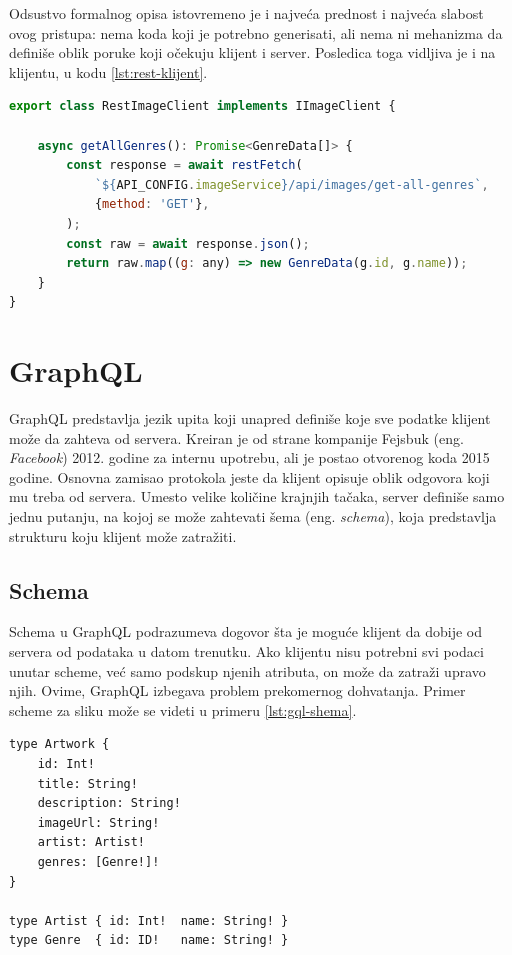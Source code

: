 \documentclass[12pt,oneside]{memoir}
\begin{document}
Odsustvo formalnog opisa istovremeno je i najveća prednost i najveća slabost
ovog pristupa: nema koda koji je potrebno generisati, ali nema ni mehanizma da definiše oblik poruke koji očekuju klijent i server. 
Posledica toga vidljiva je i na klijentu, u kodu \ref{lst:rest-klijent}.
\begin{lstlisting}[language=JavaScript,
  caption={Isečak REST implementacije za dohvatanje slika na klijentu},
  label={lst:rest-klijent}]
export class RestImageClient implements IImageClient {

    async getAllGenres(): Promise<GenreData[]> {
        const response = await restFetch(
            `${API_CONFIG.imageService}/api/images/get-all-genres`,
            {method: 'GET'},
        );
        const raw = await response.json();
        return raw.map((g: any) => new GenreData(g.id, g.name));
    }
}
\end{lstlisting}


\section{GraphQL}

GraphQL predstavlja jezik upita koji unapred definiše koje sve podatke klijent može da zahteva od servera. Kreiran 
je od strane kompanije Fejsbuk (eng. \textit{Facebook}) 2012. godine za internu upotrebu, ali je postao 
otvorenog koda 2015 godine. Osnovna zamisao protokola jeste da klijent opisuje oblik 
odgovora koji mu treba od servera. Umesto velike količine krajnjih tačaka, server definiše samo jednu putanju, 
na kojoj se može zahtevati šema (eng. \textit{schema}), koja predstavlja strukturu koju klijent može zatražiti. 

\subsection{Schema}

Schema u GraphQL podrazumeva dogovor šta je moguće klijent da dobije od servera od podataka u datom trenutku. 
Ako klijentu nisu potrebni svi podaci unutar scheme, već samo podskup njenih atributa, on može da zatraži upravo njih. 
Ovime, GraphQL izbegava problem prekomernog dohvatanja. Primer scheme za sliku može se videti u primeru \ref{lst:gql-shema}.


\begin{lstlisting}[language=GraphQLSchema,
  caption={Deo scheme mikroservisa za slike},
  label={lst:gql-shema}]
type Artwork {
    id: Int!
    title: String!
    description: String!
    imageUrl: String!
    artist: Artist!
    genres: [Genre!]!
}

type Artist { id: Int!  name: String! }
type Genre  { id: ID!   name: String! }
\end{lstlisting}
\end{document}
